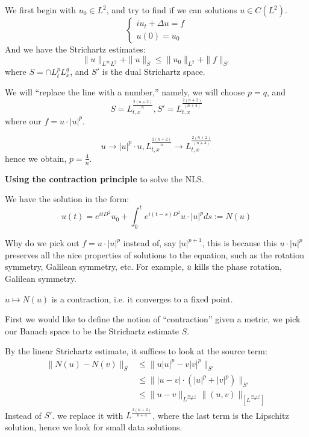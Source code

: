 We first begin with $u_0\in L^2$, and try to find if we can solutions $u\in C(L^2)$. 
\begin{equation*}
    \begin{cases}
        iu_t+\Delta u=f\\
        u(0)=u_0
    \end{cases}
\end{equation*}
And we have the Strichartz estimates:
\begin{equation*}
    \|u\|_{L^\infty L^2}+\|u\|_{S}\leq\|u_0\|_{L^2}+\|f\|_{S'}
\end{equation*}
where $S=\cap L_t^pL_x^q$, and $S'$ is the dual Strichartz space.

We will ``replace the line with a number,'' namely, we will choose $p=q$, and
\begin{equation*}
    S=L_{t,x}^{\frac{2(n+2)}{n}}, S'=L_{t,x}^\frac{2(n+2)}{(n+4)}
\end{equation*}
where our $f=u\cdot|u|^p$.

\begin{equation*}
    u\rightarrow |u|^p\cdot u, L_{t,x}^{\frac{2(n+2)}{n}}\to L_{t,x}^\frac{2(n+2)}{(n+4)}
\end{equation*}
hence we obtain, $p=\frac{4}{n}$. 

\textbf{Using the contraction principle} to solve the NLS.

We have the solution in the form:
\begin{equation*}
    u(t)=e^{itD^2}u_0+\int_0^te^{i(t-s)D^2}u\cdot |u|^pds:= N(u)
\end{equation*}
\begin{note}
    Why do we pick out $f=u\cdot|u|^p$ instead of, say $|u|^{p+1}$, this is because this $u\cdot|u|^p$ preserves all the nice properties of solutions to the equation, such as the rotation symmetry, Galilean symmetry, etc. For example, 
    $\overline{u}$ kills the phase rotation, Galilean symmetry.
\end{note}

\begin{proposition}
    $u\mapsto N(u)$ is a contraction, i.e. it converges to a fixed point.
\end{proposition}
First we would like to define the notion of ``contraction'' given a metric, we pick our Banach space to be the Strichartz estimate $S$.

By the linear Strichartz estimate, it suffices to look at the source term:
\begin{align*}
    \|N(u)-N(v)\|_S&\leq \|u|u|^p-v|v|^p\|_{S'}\\
    &\leq\||u-v|\cdot(|u|^p+|v|^p)\|_{S'}\\
    &\leq\|u-v\|_{L^\frac{2n+1}{n}}\|(u,v)\|_[L^\frac{2n+2}{n}]
\end{align*}
Instead of $S'$. we replace it with $L^\frac{2(n+2)}{n+4}$, where the last term is the Lipschitz solution, hence we look for small data solutions.

